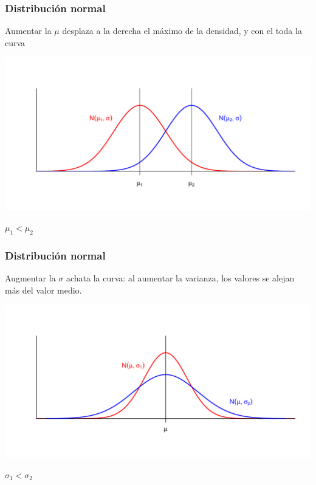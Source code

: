 \documentclass[handout]{beamer}\usepackage[]{graphicx}\usepackage[]{color}
\theoremstyle{plain}
\theoremstyle{definition}
\begin{document}
\begin{frame}
\frametitle{Distribución normal}

Aumentar la $\mu$ desplaza a la derecha el máximo de la densidad, y con el toda la curva
\begin{center}
\includegraphics[width=\linewidth]{mu1mu2}

$\mu_1<\mu_2$
\end{center}
\end{frame}




\begin{frame}
\frametitle{Distribución normal}

Augmentar la $\sigma$ achata la curva: al aumentar la varianza, los valores se alejan más del valor medio.
\begin{center}
\includegraphics[width=\linewidth]{sigma1sigma2}

$\sigma_1<\sigma_2$
\end{center}
\end{frame}
\end{document}
